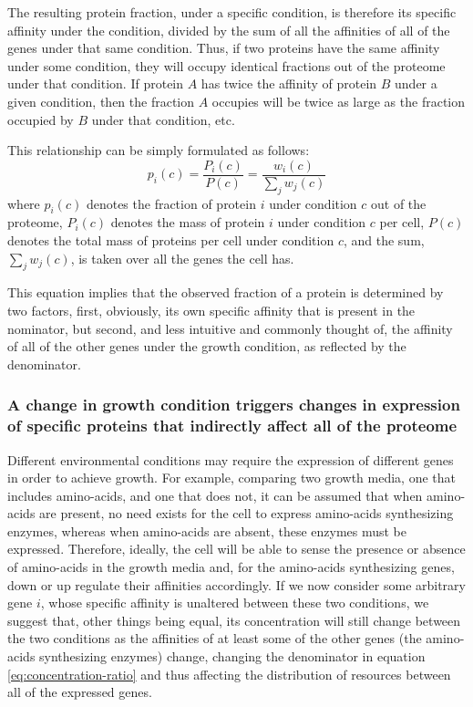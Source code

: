 \documentclass[notitlepage]{article}
\begin{document}
The resulting protein fraction, under a specific condition, is therefore its specific affinity under the condition, divided by the sum of all the affinities of all of the genes under that same condition.
Thus, if two proteins have the same affinity under some condition, they will occupy identical fractions out of the proteome under that condition.
If protein $A$ has twice the affinity of protein $B$ under a given condition, then the fraction $A$ occupies will be twice as large as the fraction occupied by $B$ under that condition, etc.

This relationship can be simply formulated as follows:
\begin{equation}
  \label{eq:concentration-ratio}
  p_i(c)=\frac{P_i(c)}{P(c)}=\frac{w_i(c)}{\sum_jw_j(c)}
\end{equation}
where $p_i(c)$ denotes the fraction of protein $i$ under condition $c$ out of the proteome, $P_i(c)$ denotes the mass of protein $i$ under condition $c$ per cell, $P(c)$ denotes the total mass of proteins per cell under condition $c$, and the sum, $\sum_jw_j(c)$, is taken over all the genes the cell has.

This equation implies that the observed fraction of a protein is determined by two factors, first, obviously, its own specific affinity that is present in the nominator, but second, and less intuitive and commonly thought of, the affinity of all of the other genes under the growth condition, as reflected by the denominator.

\subsubsection{A change in growth condition triggers changes in expression of specific proteins that indirectly affect all of the proteome}
Different environmental conditions may require the expression of different genes in order to achieve growth.
For example, comparing two growth media, one that includes amino-acids, and one that does not, it can be assumed that when amino-acids are present, no need exists for the cell to express amino-acids synthesizing enzymes, whereas when amino-acids are absent, these enzymes must be expressed.
Therefore, ideally, the cell will be able to sense the presence or absence of amino-acids in the growth media and, for the amino-acids synthesizing genes, down or up regulate their affinities accordingly.
If we now consider some arbitrary gene $i$, whose specific affinity is unaltered between these two conditions, we suggest that, other things being equal, its concentration will still change between the two conditions as the affinities of at least some of the other genes (the amino-acids synthesizing enzymes) change, changing the denominator in equation \ref{eq:concentration-ratio} and thus affecting the distribution of resources between all of the expressed genes.
\end{document}
